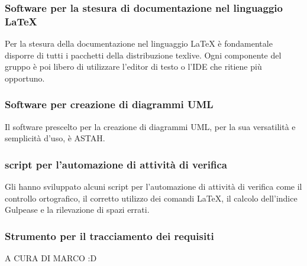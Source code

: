 		\subsubsection{Software per la stesura di documentazione nel linguaggio \LaTeX{}}	
			Per la stesura della documentazione nel linguaggio \LaTeX{} è fondamentale disporre di tutti i pacchetti della distribuzione texlive. Ogni componente del gruppo \groupname{} è poi libero di utilizzare l'editor di testo o l'IDE che ritiene più opportuno.
		\subsubsection{Software per creazione di diagrammi UML}
			Il software prescelto per la creazione di diagrammi UML, per la sua versatilità e semplicità d'uso, è ASTAH.
		\subsubsection{script per l'automazione di attività di verifica}
			Gli  hanno sviluppato alcuni script per l'automazione di attività di verifica come il controllo ortografico, il corretto utilizzo dei comandi \LaTeX{}, il calcolo dell'indice Gulpease e la rilevazione di spazi errati.
		\subsubsection{Strumento per il tracciamento dei requisiti}
			A CURA DI MARCO :D
